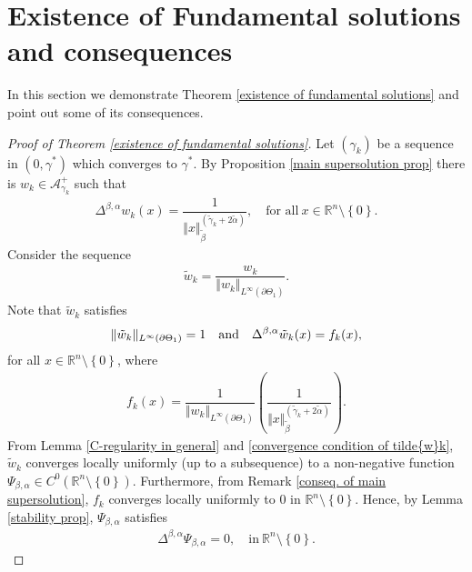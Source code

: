 \documentclass[10pt, leqno]{article}
\theoremstyle{definition}
\theoremstyle{remark}
\numberwithin{equation}{section}
\begin{document}
\section{Existence of Fundamental solutions and consequences}
\label{sec Existence of Fundamental solutions and consequences}
In this section we demonstrate Theorem \ref{existence of fundamental solutions} and point out some of its consequences.
\begin{proof}[Proof of Theorem \ref{existence of fundamental solutions}]

Let $(\gamma_{k})$ be a sequence in $(0, \gamma^{*})$ which converges to $\gamma^{\ast}$. By Proposition \ref{main supersolution prop} there is $w_{k} \in \mathcal{A}^{+}_{\gamma_{k}}$ such that
\begin{eqnarray}
\Delta^{\beta, \alpha} w_{k}(x) = \dfrac{1}{\Vert x \Vert_{\tilde{\beta}}^{\left( \tilde{\gamma}_{k} + 2\tilde{\alpha} \right)}}, \quad \text{for all} \ x \in \mathbb{R}^{n} \setminus \left\lbrace 0 \right\rbrace.
\end{eqnarray}
Consider the sequence
\begin{eqnarray}
\tilde{w}_{k} = \dfrac{w_{k}}{\Vert w_{k} \Vert_{L^{\infty}(\partial \Theta_{1})}}.
\end{eqnarray}
Note that $\tilde{w}_{k}$ satisfies
\begin{eqnarray}
\label{convergence condition of tilde{w}k}
\Vert \tilde{w}_{k} \Vert_{L^{\infty}(\partial \Theta_{1})} = 1 \quad \text{and} \quad \Delta^{\beta, \alpha} \tilde{w}_{k} (x) = f_{k}(x),
\end{eqnarray}
for all $x \in \mathbb{R}^{n} \setminus \left\lbrace 0 \right\rbrace$, where
\begin{eqnarray}
f_{k}(x) = \dfrac{1}{\Vert w_{k} \Vert_{L^{\infty}(\partial \Theta_{1})}} \left(\dfrac{1}{\Vert x \Vert_{\tilde{\beta}}^{\left( \tilde{\gamma}_{k} + 2\tilde{\alpha} \right)}}\right).
\end{eqnarray}
From Lemma \ref{C-regularity in general} and \eqref{convergence condition of tilde{w}k}, $\tilde{w}_{k}$ converges locally uniformly (up to a subsequence) to a non-negative function $\Psi_{\beta, \alpha}\in C^{0}\left( \mathbb{R}^{n} \setminus \left\lbrace 0 \right\rbrace \right)$. Furthermore, from Remark \ref{conseq. of main supersolution}, $f_{k}$ converges locally uniformly to $0$ in $\mathbb{R}^{n} \setminus \left\lbrace 0 \right\rbrace$. Hence, by Lemma \ref{stability prop}, $\Psi_{\beta, \alpha}$ satisfies
\begin{eqnarray}
\Delta^{\beta, \alpha} \Psi_{\beta, \alpha} = 0, \quad \text{in} \ \mathbb{R}^{n} \setminus \left\lbrace 0 \right\rbrace.

\end{eqnarray}
\end{proof}
\end{document}
